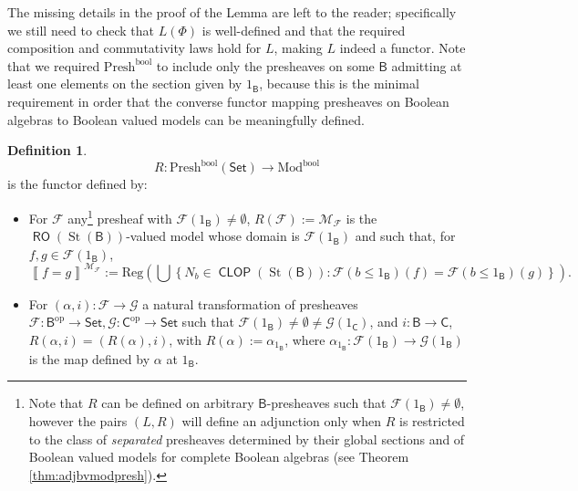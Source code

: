 \documentclass[11pt]{amsart}
\newcommand{\Mod}{\textrm{Mod}}
\newcommand{\F}{\mathcal{F}}
\newcommand{\G}{\mathcal{G}}
\newcommand{\Presh}{\textrm{Presh}}
\newcommand{\SPresh}{\textrm{S-Presh}}
\newcommand{\modx}{\Mod^{\textrm{bool}}}
\theoremstyle{plain}
\newtheorem{proposition}[theorem]{Proposition}
\theoremstyle{definition}
\newtheorem{definition}[theorem]{Definition}
\theoremstyle{plain}
\theoremstyle{remark}
\newcommand{\M}{\mathcal{M}}
\newcommand{\dSet}{\mathsf{Set}}
\DeclareMathOperator{\St}{St}
\DeclareMathOperator{\RO}{\mathsf{RO}}
\DeclareMathOperator{\CLOP}{\mathsf{CLOP}}
\newcommand{\bool}[1]{\mathsf{#1}}
\newcommand{\Reg}[1]{\mathrm{Reg}\left(#1\right)}
\newcommand{\cp}[1]{\left( #1 \right)}
\newcommand{\Qp}[1]{\left\llbracket #1 \right\rrbracket}
\newcommand{\bp}[1]{\left\lbrace #1 \right\rbrace}
\newcommand{\0}{\mathsf{0}}
\renewcommand{\1}{\mathsf{1}}
\renewcommand{\2}{\mathsf{2}}
\theoremstyle{definition}
\begin{document}
The missing details in the proof of the Lemma are left to the reader; specifically we still need to check that $L(\Phi)$ is well-defined and that the required composition and commutativity laws 
hold for $L$, making $L$ indeed a functor. 
Note that we required $\Presh^{\textrm{bool}}$ to include only the presheaves on some $\bool{B}$ admitting at least one elements on the section given by $1_\bool{B}$, because this is the minimal requirement in order that the converse functor mapping  presheaves on Boolean algebras to Boolean valued models can be meaningfully defined.

\begin{definition}
\[
R:\Presh^{\textrm{bool}}(\dSet)\to\modx
\]
is the functor defined by:
\begin{itemize}
\item For $\F$ any\footnote{Note that $R$ can be defined on arbitrary $\bool{B}$-presheaves such that $\F(1_\bool{B})\neq\emptyset$, however the pairs $\cp{L,R}$ will define an adjunction only when $R$ is restricted to the class of \emph{separated} 
presheaves determined by their global sections and of Boolean valued models for complete Boolean algebras (see Theorem \ref{thm:adjbvmodpresh}).} presheaf with $\F(1_\bool{B})\neq\emptyset$, 
$R(\F):=\M_\F$ is the $\RO(\St(\bool{B}))$-valued model whose domain is $\F(1_\bool{B})$ and such that, for $f, g\in \F(1_\bool{B})$, 
\[
\Qp{f=g}^{\M_\F}:=\Reg{\bigcup\bp{N_b\in\CLOP(\St(\bool{B})): \F(b\leq 1_\bool{B})(f)=\F(b\leq1_\bool{B})(g)}}.
\]
\item For $(\alpha, i):\F\to\G$ a natural transformation of presheaves $\F:\bool{B}^{\textrm{op}}\to\dSet, \G:\bool{C}^{\textrm{op}}\to\dSet$ such that $\F(1_\bool{B})\neq\emptyset\neq\G(1_{\bool{C}})$, and $i:\bool{B}\to\bool{C}$, $R(\alpha, i)=(R(\alpha), i)$, with $R(\alpha):=\alpha_{1_\bool{B}}$, where $\alpha_{1_\bool{B}}:\F(1_\bool{B})\to\G(1_\bool{B})$ is the map defined by
$\alpha$ at $1_\bool{B}$.
\end{itemize}
\end{definition}
%
%
\end{document}
